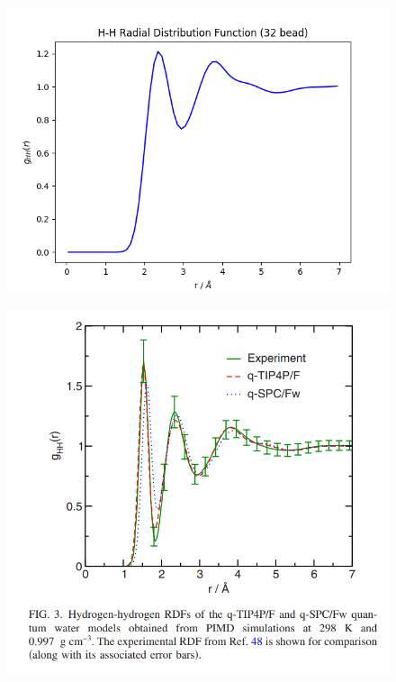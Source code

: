 \documentclass[12pt,reqno]{amsart}
\numberwithin{equation}{section}
\begin{document}
\begin{enumerate}
\begin{figure}[H]
\centering
\includegraphics[scale=0.6]{1_1-32bead-tip4pF.png}
\end{figure}

\begin{figure}[H]
\centering
\includegraphics[scale=0.6]{Markland-1_1-RDF}
\end{figure}


\end{enumerate}
\end{document}
